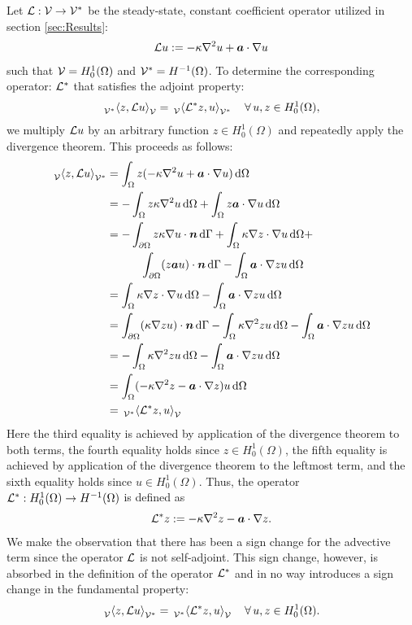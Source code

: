 Let $\mathcal{L}: \mathcal{V} \to \mathcal{V}^*$
be the steady-state, constant coefficient operator
utilized in section \ref{sec:Results}:
%
\begin{gather}
\mathcal{L} u := -\kappa \nabla^2 {u} + \boldsymbol{a} \cdot \nabla {u}
\end{gather}
such that $\mathcal{V} = H^1_0(\Omega)$ and $\mathcal{V}^* = H^{-1}(\Omega)$.
To determine the corresponding operator:
$\mathcal{L}^*$ that satisfies the adjoint property:
%
\begin{gather}
\,{}_{\mathcal{V}^*}^{}\!\left< {z}, {\mathcal{L} u} \right>_{\mathcal{V}} = \,{}_{\mathcal{V}}^{}\!\left< {\mathcal{L}^* z}, {u} \right>_{\mathcal{V}^*}
\quad \forall \, u, z \in H^1_0(\Omega),
\end{gather}
%
we multiply $\mathcal{L} u$ by an
arbitrary function $z \in H^1_0(\Omega)$ and
repeatedly apply the divergence theorem.
This proceeds as follows:
%
\begin{align*}
\,{}_{\mathcal{V}}^{}\!\left< {z}, {\mathcal{L} u} \right>_{\mathcal{V}^*}
&=
\int_{\Omega} z (-\kappa \nabla^2 {u} + \boldsymbol{a} \cdot \nabla {u}) \, \text{d} \Omega \\
&=
- \int_{\Omega} z \kappa \nabla^2 u \, \text{d} \Omega +
\int_{\Omega} z \boldsymbol{a} \cdot \nabla u \, \text{d} \Omega \\
&=
-\int_{\partial \Omega} z \kappa \nabla u \cdot \boldsymbol{n} \, \text{d} \Gamma +
\int_{\Omega} \kappa \nabla z \cdot \nabla u \, \text{d} \Omega + \\
& \quad \quad \quad \int_{\partial \Omega} (z \boldsymbol{a} u) \cdot \boldsymbol{n} \, \text{d} \Gamma -
\int_{\Omega} \boldsymbol{a} \cdot \nabla z u \, \text{d} \Omega \\
&=
\int_{\Omega} \kappa \nabla z \cdot \nabla u \, \text{d} \Omega -
\int_{\Omega} \boldsymbol{a} \cdot \nabla z u \, \text{d} \Omega \\
&=
\int_{\partial \Omega} (\kappa \nabla z u) \cdot \boldsymbol{n} \, \text{d} \Gamma -
\int_{\Omega} \kappa \nabla^2 z u \, \text{d} \Omega -
\int_{\Omega} \boldsymbol{a} \cdot \nabla z u \, \text{d} \Omega \\
&=
- \int_{\Omega} \kappa \nabla^2 z u \, \text{d} \Omega -
\int_{\Omega} \boldsymbol{a} \cdot \nabla z u \, \text{d} \Omega \\
&=
\int_{\Omega} (-\kappa \nabla^2 {z} - \boldsymbol{a} \cdot \nabla {z}) u \,
\text{d} \Omega \\
&=
\,{}_{\mathcal{V}^*}^{}\!\left< {\mathcal{L}^* z}, {u} \right>_{\mathcal{V}}
\end{align*}
%
Here the third equality is achieved by application
of the divergence theorem to both terms,
the fourth equality holds since $z \in H^1_0(\Omega)$,
the fifth equality is achieved by application of the
divergence theorem to the leftmost term, and the sixth
equality holds since $u \in H^1_0(\Omega)$. Thus, the
operator $\mathcal{L}^* : H^1_0(\Omega) \to H^{-1}(\Omega)$ is defined as
%
\begin{gather}
\mathcal{L}^* z := -\kappa \nabla^2 {z} - \boldsymbol{a} \cdot \nabla {z}.
\end{gather}
%
We make the observation that there has been a sign
change for the advective term since the operator
$\mathcal{L}$ is not self-adjoint.
This sign change, however, is absorbed in the definition
of the operator $\mathcal{L}^*$ and in no way introduces
a sign change in the fundamental property:
%
\begin{gather}
\,{}_{\mathcal{V}}^{}\!\left< {z}, {\mathcal{L} u} \right>_{\mathcal{V}^*} = \,{}_{\mathcal{V}^*}^{}\!\left< {\mathcal{L}^* z}, {u} \right>_{\mathcal{V}} \quad \forall \, u, z \in H^1_0(\Omega).
\label{eq:adv_adjoint}
\end{gather}

